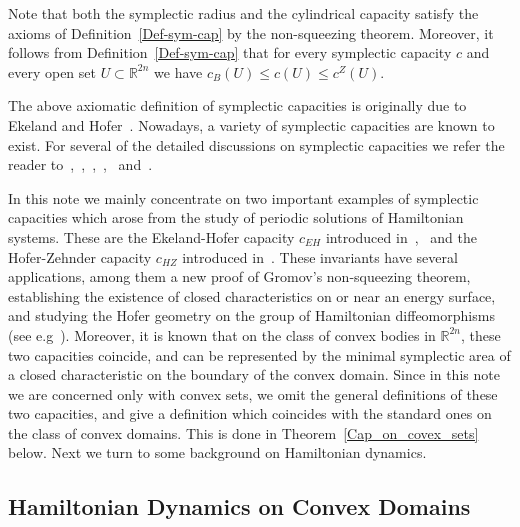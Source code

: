 \documentclass[12pt]{article}
\begin{document}
Note that both the symplectic radius and the cylindrical capacity
satisfy the axioms of Definition~\ref{Def-sym-cap} by the
non-squeezing theorem. Moreover, it follows from
Definition~\ref{Def-sym-cap} that for every symplectic capacity
$c$ and every open set $U \subset {\mathbb R}^{2n}$ we have
$c_B(U) \le c(U) \le c^Z(U)$.

The above axiomatic definition of symplectic capacities is
originally due to Ekeland and Hofer~\cite{EH}. Nowadays, a variety
of symplectic capacities are known to exist. %
For several of the detailed discussions on symplectic capacities we
refer the reader
to~\cite{CHLS},~\cite{Ho},~\cite{HZ},~\cite{L},~\cite{Mc}
and~\cite{V1}.

In this note we mainly concentrate on two important examples of
symplectic capacities which arose from the study of periodic
solutions of Hamiltonian systems. These are the Ekeland-Hofer
capacity $c_{EH}$ introduced in~\cite{EH},~\cite{EH1} and the
Hofer-Zehnder capacity $c_{HZ}$ introduced in~\cite{HZ1}. These
invariants have several applications, among them a new proof of
Gromov's non-squeezing theorem, establishing the existence of closed
characteristics on or near an energy surface, and studying the Hofer
geometry on the group of Hamiltonian diffeomorphisms (see
e.g~\cite{HZ}). Moreover, it is known that on the class of convex
bodies in ${\mathbb R}^{2n}$, these two capacities coincide, and %
can be represented by the minimal symplectic area of a closed
characteristic on the boundary of the convex domain. %
Since in this note we are concerned only with convex sets, we omit
the general definitions of these two capacities, and give a
definition which coincides with the standard ones on the class of
convex domains. This is done in Theorem~\ref{Cap_on_covex_sets}
below. Next we turn to some background on Hamiltonian dynamics.


\subsection{Hamiltonian Dynamics on Convex Domains} \label{sec-Ham-dynm}
\end{document}
